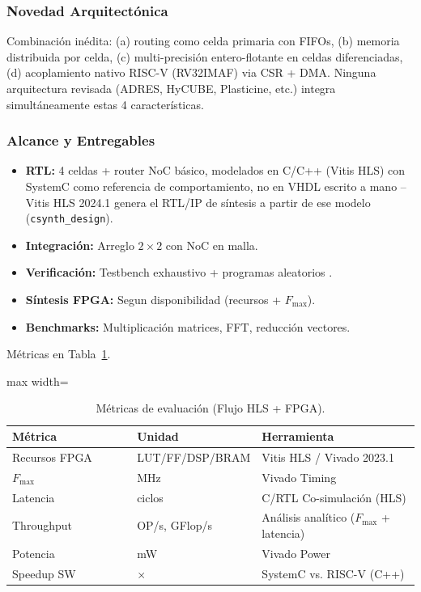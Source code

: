 \documentclass[conference]{IEEEtran}
\begin{document}
\subsubsection{Novedad Arquitectónica}
Combinación inédita: (a) routing como celda primaria con FIFOs, (b) memoria distribuida por celda, (c) multi-precisión entero-flotante en celdas diferenciadas, (d) acoplamiento nativo RISC-V (RV32IMAF) via CSR + DMA. Ninguna arquitectura revisada (ADRES, HyCUBE, Plasticine, etc.) integra simultáneamente estas 4 características.

\subsubsection{Alcance y Entregables}
\begin{itemize}
    \item \textbf{RTL:} 4 celdas + router NoC básico, modelados en C/C++ (Vitis HLS) con SystemC como referencia de comportamiento, no en VHDL escrito a mano -- Vitis HLS 2024.1 genera el RTL/IP de síntesis a partir de ese modelo (\texttt{csynth\_design}).
    \item \textbf{Integración:} Arreglo $2\times2$ con NoC en malla.
    \item \textbf{Verificación:} Testbench exhaustivo + programas aleatorios \cite{verification_cgra}.
    \item \textbf{Síntesis FPGA:} Segun disponibilidad (recursos + $F_{\max}$).
    \item \textbf{Benchmarks:} Multiplicación matrices, FFT, reducción vectores.
\end{itemize}

Métricas en Tabla~\ref{tab:metricas_hls}.

\begin{table}[htbp]
\centering
\caption{Métricas de evaluación (Flujo HLS + FPGA).}
\label{tab:metricas_hls}
\scriptsize
\begin{adjustbox}{max width=\columnwidth}
\begin{tabular}{@{}p{0.35\linewidth}p{0.20\linewidth}p{0.45\linewidth}@{}}
\toprule
\textbf{Métrica} & \textbf{Unidad} & \textbf{Herramienta} \\
\midrule
Recursos FPGA & LUT/FF/DSP/BRAM & Vitis HLS / Vivado 2023.1 \\
$F_{\max}$ & MHz & Vivado Timing \\
Latencia & ciclos & C/RTL Co-simulación (HLS) \\
Throughput & OP/s, GFlop/s & Análisis analítico ($F_{\max}$ + latencia) \\
Potencia & mW & Vivado Power \\
Speedup SW & $\times$ & SystemC vs. RISC-V (C++) \\
\bottomrule
\end{tabular}
\end{adjustbox}
\end{table}
\end{document}
